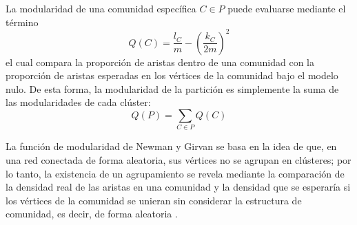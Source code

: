 La modularidad de una comunidad específica $C\in P$ puede evaluarse mediante el término
\begin{equation}
	Q(C) = \frac{l_C}{m}-\left( \frac{k_C}{2m}\right)^2
\end{equation}
el cual compara la proporción de aristas dentro de una comunidad con la proporción de aristas esperadas en los vértices de la comunidad bajo el modelo nulo. De esta forma, la modularidad de la partición es simplemente la suma de las modularidades de cada clúster:
\begin{equation}
	Q(P) = \sum_{C\in P} Q(C)
\end{equation}




La función de modularidad de Newman y Girvan se basa en la idea de que, en una red conectada de forma aleatoria, sus vértices no se agrupan en clústeres; por lo tanto, la existencia de un agrupamiento se revela mediante la comparación de la densidad real de las aristas en una comunidad y la densidad que se esperaría si los vértices de la comunidad se unieran sin considerar la estructura de comunidad, es decir, de forma aleatoria \parencite[p.~89]{Fortunato2010}.

